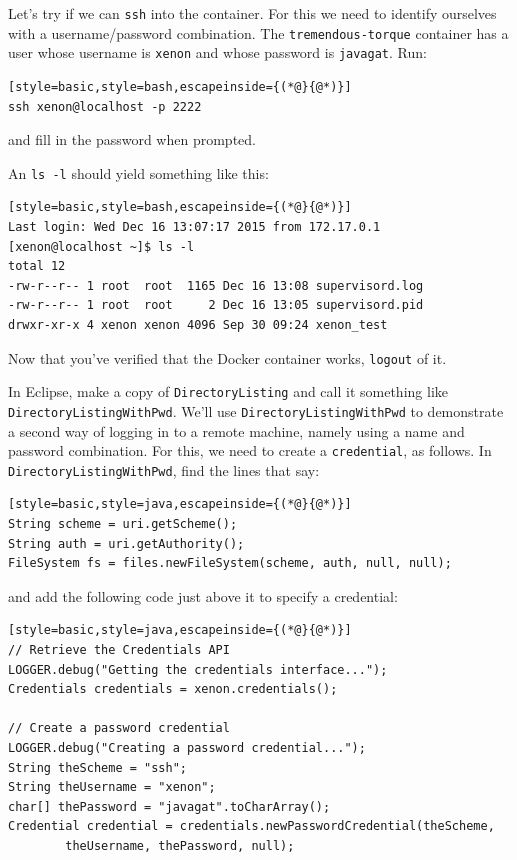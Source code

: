 \documentclass[12pt, a4paper, twoside, openany, titlepage]{book}
\begin{document}
Let's try if we can \texttt{ssh} into the container. For this we need to identify ourselves with a username/password combination. The \texttt{tremendous-torque} container has a user whose username is \texttt{xenon} and whose password is \texttt{javagat}. Run:
\begin{lstlisting}[style=basic,style=bash,escapeinside={(*@}{@*)}]
ssh xenon@localhost -p 2222
\end{lstlisting}
and fill in the password when prompted.

An \texttt{ls -l} should yield something like this:
\begin{lstlisting}[style=basic,style=bash,escapeinside={(*@}{@*)}]
Last login: Wed Dec 16 13:07:17 2015 from 172.17.0.1
[xenon@localhost ~]$ ls -l
total 12
-rw-r--r-- 1 root  root  1165 Dec 16 13:08 supervisord.log
-rw-r--r-- 1 root  root     2 Dec 16 13:05 supervisord.pid
drwxr-xr-x 4 xenon xenon 4096 Sep 30 09:24 xenon_test
\end{lstlisting} %

Now that you've verified that the Docker container works, \texttt{logout} of it.

In Eclipse, make a copy of \texttt{DirectoryListing} and call it something like \texttt{DirectoryListingWithPwd}. We'll use \texttt{DirectoryListingWithPwd} to demonstrate a second way of logging in to a remote machine, namely using a name and password combination. For this, we need to create a \texttt{credential}, as follows. In \texttt{DirectoryListingWithPwd}, find the lines that say:
\begin{lstlisting}[style=basic,style=java,escapeinside={(*@}{@*)}]
String scheme = uri.getScheme();
String auth = uri.getAuthority();
FileSystem fs = files.newFileSystem(scheme, auth, null, null);
\end{lstlisting}

and add the following code just above it to specify a credential:
\begin{lstlisting}[style=basic,style=java,escapeinside={(*@}{@*)}]
// Retrieve the Credentials API
LOGGER.debug("Getting the credentials interface...");
Credentials credentials = xenon.credentials();

// Create a password credential
LOGGER.debug("Creating a password credential...");
String theScheme = "ssh";
String theUsername = "xenon";
char[] thePassword = "javagat".toCharArray();
Credential credential = credentials.newPasswordCredential(theScheme,
        theUsername, thePassword, null);
\end{lstlisting}
\label{credentials-snippet}
\end{document}
